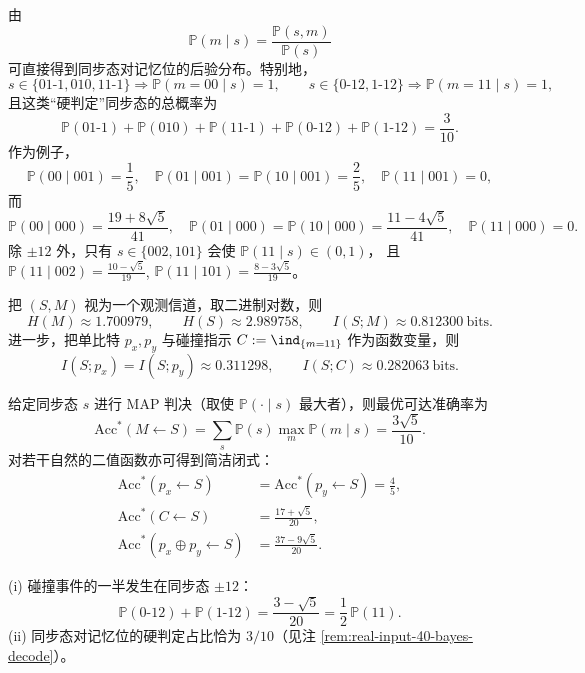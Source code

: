\begin{remark}\label{rem:real-input-40-bayes-decode}
由
\[
\mathbb{P}(m\mid s)=\frac{\mathbb{P}(s,m)}{\mathbb{P}(s)}
\]
可直接得到同步态对记忆位的后验分布。特别地，
\[
s\in\{01\text{-}1,010,11\text{-}1\}\Rightarrow \mathbb{P}(m=00\mid s)=1,
\qquad
s\in\{0\text{-}12,1\text{-}12\}\Rightarrow \mathbb{P}(m=11\mid s)=1,
\]
且这类“硬判定”同步态的总概率为
\[
\mathbb{P}(01\text{-}1)+\mathbb{P}(010)+\mathbb{P}(11\text{-}1)+\mathbb{P}(0\text{-}12)+\mathbb{P}(1\text{-}12)=\frac{3}{10}.
\]
作为例子，
\[
\mathbb{P}(00\mid 001)=\frac15,\quad
\mathbb{P}(01\mid 001)=\mathbb{P}(10\mid 001)=\frac25,\quad
\mathbb{P}(11\mid 001)=0,
\]
而
\[
\mathbb{P}(00\mid 000)=\frac{19+8\sqrt5}{41},\quad
\mathbb{P}(01\mid 000)=\mathbb{P}(10\mid 000)=\frac{11-4\sqrt5}{41},\quad
\mathbb{P}(11\mid 000)=0.
\]
除 $\pm12$ 外，只有 $s\in\{002,101\}$ 会使 $\mathbb{P}(11\mid s)\in(0,1)$，
且
\(
\mathbb{P}(11\mid 002)=\frac{10-\sqrt5}{19}
\),
\(
\mathbb{P}(11\mid 101)=\frac{8-3\sqrt5}{19}
\)。
\end{remark}

\begin{remark}\label{rem:real-input-40-mutual-info}
把 $(S,M)$ 视为一个观测信道，取二进制对数，则
\[
H(M)\approx 1.700979,\qquad
H(S)\approx 2.989758,\qquad
I(S;M)\approx 0.812300\ \text{bits}.
\]
进一步，把单比特 $p_x,p_y$ 与碰撞指示 $C:=\ind_{\{m=11\}}$ 作为函数变量，则
\[
I(S;p_x)=I(S;p_y)\approx 0.311298,\qquad
I(S;C)\approx 0.282063\ \text{bits}.
\]
\end{remark}

\begin{proposition}\label{prop:real-input-40-map-accuracies}
给定同步态 $s$ 进行 MAP 判决（取使 $\mathbb{P}(\cdot\mid s)$ 最大者），则最优可达准确率为
\[
\mathrm{Acc}^*(M\leftarrow S)=\sum_s \mathbb{P}(s)\max_m \mathbb{P}(m\mid s)=\frac{3\sqrt5}{10}.
\]
对若干自然的二值函数亦可得到简洁闭式：
\[
\begin{aligned}
\mathrm{Acc}^*(p_x\leftarrow S)&=\mathrm{Acc}^*(p_y\leftarrow S)=\frac45,\\
\mathrm{Acc}^*(C\leftarrow S)&=\frac{17+\sqrt5}{20},\\
\mathrm{Acc}^*(p_x\oplus p_y\leftarrow S)&=\frac{37-9\sqrt5}{20}.
\end{aligned}
\]
\end{proposition}

\begin{remark}\label{rem:real-input-40-two-dyn-inferences}
(i) 碰撞事件的一半发生在同步态 $\pm12$：
\[
\mathbb{P}(0\text{-}12)+\mathbb{P}(1\text{-}12)=\frac{3-\sqrt5}{20}=\frac12\,\mathbb{P}(11).
\]
(ii) 同步态对记忆位的硬判定占比恰为 $3/10$（见注 \ref{rem:real-input-40-bayes-decode}）。
\end{remark}

